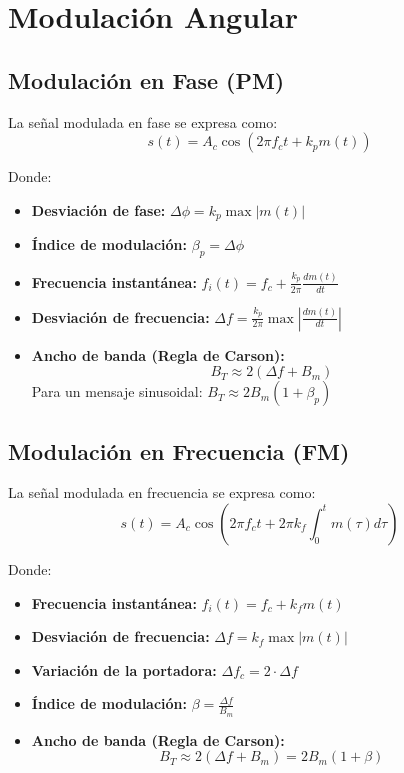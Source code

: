 \documentclass{article}
\begin{document}
\section{Modulación Angular}

\subsection{Modulación en Fase (PM)}

La señal modulada en fase se expresa como:
\[ s(t) = A_c \cos(2\pi f_c t + k_p m(t)) \]

Donde:
\begin{itemize}
      \item \textbf{Desviación de fase:} $\Delta \phi = k_p \max|m(t)|$
      \item \textbf{Índice de modulación:} $\beta_p = \Delta \phi$
      \item \textbf{Frecuencia instantánea:} $f_i(t) = f_c + \frac{k_p}{2\pi} \frac{d m(t)}{dt}$
      \item \textbf{Desviación de frecuencia:} $\Delta f = \frac{k_p}{2\pi} \max\left|\frac{d m(t)}{dt}\right|$
      \item \textbf{Ancho de banda (Regla de Carson):}
            \[ B_T \approx 2(\Delta f + B_m) \]
            Para un mensaje sinusoidal: $B_T \approx 2B_m(1 + \beta_p)$
\end{itemize}

\subsection{Modulación en Frecuencia (FM)}

La señal modulada en frecuencia se expresa como:
\[ s(t) = A_c \cos\left(2\pi f_c t + 2\pi k_f \int_{0}^{t} m(\tau) d\tau\right) \]

Donde:
\begin{itemize}
      \item \textbf{Frecuencia instantánea:} $f_i(t) = f_c + k_f m(t)$
      \item \textbf{Desviación de frecuencia:} $\Delta f = k_f \max|m(t)|$
      \item \textbf{Variación de la portadora:} $\Delta f_c = 2 \cdot \Delta f$
      \item \textbf{Índice de modulación:} $\beta = \frac{\Delta f}{B_m}$
      \item \textbf{Ancho de banda (Regla de Carson):}
            \[ B_T \approx 2(\Delta f + B_m) = 2B_m(1 + \beta) \]
\end{itemize}
\end{document}
